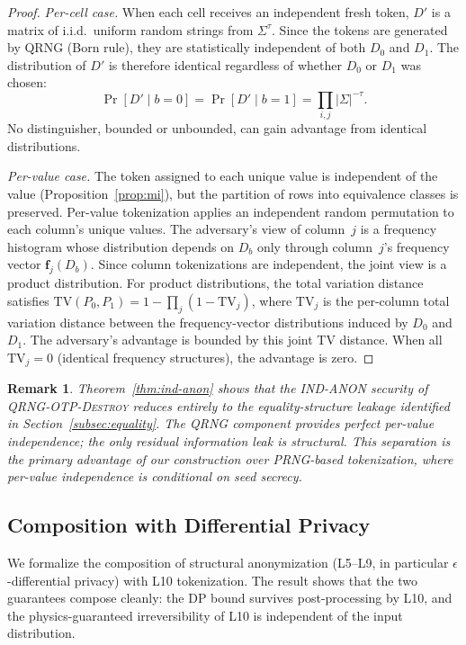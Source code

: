 \documentclass[journal]{IEEEtran}
\newtheorem*{remark}{Remark}
\begin{document}
\begin{proof}
\emph{Per-cell case.} When each cell receives an independent fresh token, $D'$ is a matrix of i.i.d.\ uniform random strings from $\Sigma^\tau$. Since the tokens are generated by QRNG (Born rule), they are statistically independent of both $D_0$ and $D_1$. The distribution of $D'$ is therefore identical regardless of whether $D_0$ or $D_1$ was chosen:
\[
\Pr[D' \mid b{=}0] = \Pr[D' \mid b{=}1] = \prod_{i,j} |\Sigma|^{-\tau}.
\]
No distinguisher, bounded or unbounded, can gain advantage from identical distributions.

\emph{Per-value case.} The token assigned to each unique value is independent of the value (Proposition~\ref{prop:mi}), but the partition of rows into equivalence classes is preserved. Per-value tokenization applies an independent random permutation to each column's unique values. The adversary's view of column~$j$ is a frequency histogram whose distribution depends on $D_b$ only through column~$j$'s frequency vector $\mathbf{f}_j(D_b)$. Since column tokenizations are independent, the joint view is a product distribution. For product distributions, the total variation distance satisfies $\mathrm{TV}(P_0, P_1) = 1 - \prod_j (1 - \mathrm{TV}_j)$, where $\mathrm{TV}_j$ is the per-column total variation distance between the frequency-vector distributions induced by $D_0$ and $D_1$. The adversary's advantage is bounded by this joint TV distance. When all $\mathrm{TV}_j = 0$ (identical frequency structures), the advantage is zero.
\end{proof}

\begin{remark}
Theorem~\ref{thm:ind-anon} shows that the IND-ANON security of \textsc{QRNG-OTP-Destroy} reduces entirely to the equality-structure leakage identified in Section~\ref{subsec:equality}. The QRNG component provides perfect per-value independence; the only residual information leak is structural. This separation is the primary advantage of our construction over PRNG-based tokenization, where per-value independence is conditional on seed secrecy.
\end{remark}

\subsection{Composition with Differential Privacy}
\label{subsec:composition}

We formalize the composition of structural anonymization (L5--L9, in particular $\epsilon$-differential privacy) with L10 tokenization. The result shows that the two guarantees compose cleanly: the DP bound survives post-processing by L10, and the physics-guaranteed irreversibility of L10 is independent of the input distribution.
\end{document}
